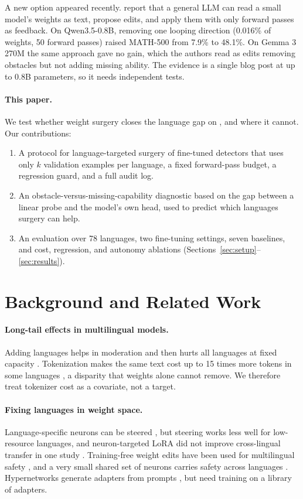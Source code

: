 \documentclass[11pt]{article}
\begin{document}
A new option appeared recently. \citet{takehi2026weightspace} report that a general LLM can read a small model's weights as text, propose edits, and apply them with only forward passes as feedback. On Qwen3.5-0.8B, removing one looping direction (0.016\% of weights, 50 forward passes) raised MATH-500 from 7.9\% to 48.1\%. On Gemma 3 270M the same approach gave no gain, which the authors read as edits removing obstacles but not adding missing ability. The evidence is a single blog post at up to 0.8B parameters, so it needs independent tests.

\paragraph{This paper.} We test whether weight surgery closes the language gap on \bluff{}, and where it cannot. Our contributions:
\begin{enumerate}\itemsep0pt
\item A protocol for language-targeted surgery of fine-tuned detectors that uses only $k$ validation examples per language, a fixed forward-pass budget, a regression guard, and a full audit log.
\item An obstacle-versus-missing-capability diagnostic based on the gap between a linear probe and the model's own head, used to predict which languages surgery can help.
\item An evaluation over 78 languages, two fine-tuning settings, seven baselines, and cost, regression, and autonomy ablations (Sections~\ref{sec:setup}--\ref{sec:results}).
\end{enumerate}

\section{Background and Related Work}
\paragraph{Long-tail effects in multilingual models.} Adding languages helps in moderation and then hurts all languages at fixed capacity \citep{conneau2020xlmr,chang2024curse}. Tokenization makes the same text cost up to 15 times more tokens in some languages \citep{petrov2023tokenizers}, a disparity that weights alone cannot remove. We therefore treat tokenizer cost as a covariate, not a target.

\paragraph{Fixing languages in weight space.} Language-specific neurons \citep{tang2024lape} can be steered \citep{gurgurov2025arithmetics}, but steering works less well for low-resource languages, and neuron-targeted LoRA did not improve cross-lingual transfer in one study \citep{mondal2025neurons}. Training-free weight edits have been used for multilingual safety \citep{liang2026sparse}, and a very small shared set of neurons carries safety across languages \citep{zhang2026safetyneurons}. Hypernetworks generate adapters from prompts \citep{liang2025dnd}, but need training on a library of adapters.
\end{document}
